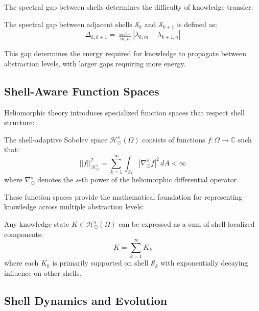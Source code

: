 The spectral gap between shells determines the difficulty of knowledge transfer:

\begin{proposition}
The spectral gap between adjacent shells $\mathcal{S}_k$ and $\mathcal{S}_{k+1}$ is defined as:
\begin{equation}
\Delta_{k,k+1} = \min_{m,n} |\lambda_{k,m} - \lambda_{k+1,n}|
\end{equation}

This gap determines the energy required for knowledge to propagate between abstraction levels, with larger gaps requiring more energy.
\end{proposition}

\subsection{Shell-Aware Function Spaces}

Heliomorphic theory introduces specialized function spaces that respect shell structure:

\begin{definition}
The shell-adaptive Sobolev space $\mathcal{H}_{\odot}^s(\Omega)$ consists of functions $f: \Omega \rightarrow \mathbb{C}$ such that:
\begin{equation}
||f||_{\mathcal{H}_{\odot}^s}^2 = \sum_{k=1}^{\infty} \int_{\mathcal{S}_k} |\nabla_{\odot}^s f|^2 \, dA < \infty
\end{equation}
where $\nabla_{\odot}^s$ denotes the $s$-th power of the heliomorphic differential operator.
\end{definition}

These function spaces provide the mathematical foundation for representing knowledge across multiple abstraction levels:

\begin{theorem}
Any knowledge state $K \in \mathcal{H}_{\odot}^s(\Omega)$ can be expressed as a sum of shell-localized components:
\begin{equation}
K = \sum_{k=1}^{\infty} K_k
\end{equation}
where each $K_k$ is primarily supported on shell $\mathcal{S}_k$ with exponentially decaying influence on other shells.
\end{theorem}

\subsection{Shell Dynamics and Evolution}

